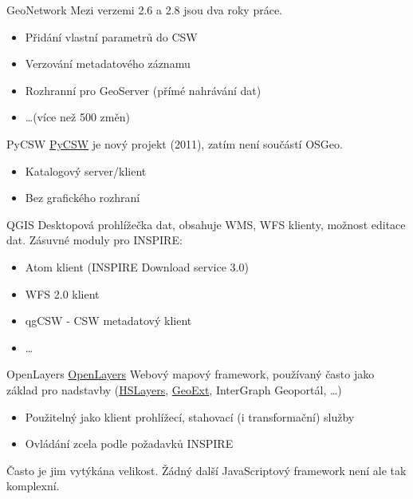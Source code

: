 \documentclass{beamer}
\begin{document}
\begin{frame}{GeoNetwork}
Mezi verzemi 2.6 a 2.8 jsou dva roky práce.
    \begin{itemize}
        \item Přidání vlastní parametrů do CSW
        \item Verzování metadatového záznamu
        \item Rozhranní pro GeoServer (přímé nahrávání dat)
        \item \dots (více než 500 změn)
    \end{itemize}
\end{frame}

\begin{frame}{PyCSW}
    \href{http://pycsw.org}{PyCSW} je nový projekt (2011), zatím není součástí OSGeo. 
    \begin{itemize}
        \item Katalogový server/klient
        \item Bez grafického rozhraní
    \end{itemize}
\end{frame}

\begin{frame}{QGIS}
    Desktopová prohlížečka dat, obsahuje WMS, WFS klienty, možnost editace dat.
    Zásuvné moduly pro INSPIRE:
    \begin{itemize}
        \item Atom klient (INSPIRE Download service 3.0)
        \item WFS 2.0 klient
        \item qgCSW - CSW metadatový klient
        \item \dots
    \end{itemize}
\end{frame}

\begin{frame}{OpenLayers}
    \href{http://openlayers.org}{OpenLayers} Webový mapový framework, používaný
    často jako základ pro nadstavby (\href{http://hslayers.org}{HSLayers},
    \href{http://geoext.org}{GeoExt}, InterGraph Geoportál, \dots)

    \begin{itemize}
        \item Použitelný jako klient prohlížecí, stahovací (i transformační) služby
        \item Ovládání zcela podle požadavků INSPIRE
    \end{itemize}

    Často je jim vytýkána velikost. Žádný další JavaScriptový framework není ale
    tak komplexní.
\end{frame}
\end{document}
